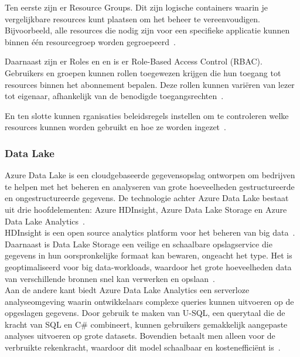 Ten eerste zijn er Resource Groups. Dit zijn logische containers waarin je vergelijkbare resources kunt plaatsen om het beheer te vereenvoudigen. Bijvoorbeeld, alle resources die nodig zijn voor een specifieke applicatie kunnen binnen één resourcegroep worden gegroepeerd~\autocite{Microsoft2024d}.


Daarnaast zijn er Roles en en is er Role-Based Access Control (RBAC). Gebruikers en groepen kunnen rollen toegewezen krijgen die hun toegang tot resources binnen het abonnement bepalen. Deze rollen kunnen variëren van lezer tot eigenaar, afhankelijk van de benodigde toegangsrechten~\autocite{Microsoft2024e}.


En ten slotte kunnen rganisaties beleidsregels instellen om te controleren welke resources kunnen worden gebruikt en hoe ze worden ingezet~\autocite{Microsoft2024f}.

\subsubsection{Data Lake}

Azure Data Lake is een cloudgebaseerde gegevensopslag ontworpen om bedrijven te helpen met het beheren en analyseren van grote hoeveelheden gestructureerde en ongestructureerde gegevens. De technologie achter Azure Data Lake bestaat uit drie hoofdelementen: Azure HDInsight, Azure Data Lake Storage en Azure Data Lake Analytics~\autocite{Awati2023a}.\\

HDInsight is een open source analytics platform voor het beheren van big data~\autocite{Awati2023a}.\\

Daarnaast is Data Lake Storage een veilige en schaalbare opslagservice die gegevens in hun oorspronkelijke formaat kan bewaren, ongeacht het type. Het is geoptimaliseerd voor big data-workloads, waardoor het grote hoeveelheden data van verschillende bronnen snel kan verwerken en opslaan~\autocite{Awati2023a}.\\

Aan de andere kant biedt Azure Data Lake Analytics een serverloze analyseomgeving waarin ontwikkelaars complexe queries kunnen uitvoeren op de opgeslagen gegevens. Door gebruik te maken van U-SQL, een querytaal die de kracht van SQL en C\# combineert, kunnen gebruikers gemakkelijk aangepaste analyses uitvoeren op grote datasets. Bovendien betaalt men alleen voor de verbruikte rekenkracht, waardoor dit model schaalbaar en kostenefficiënt is~\autocite{Awati2023a}.\\


